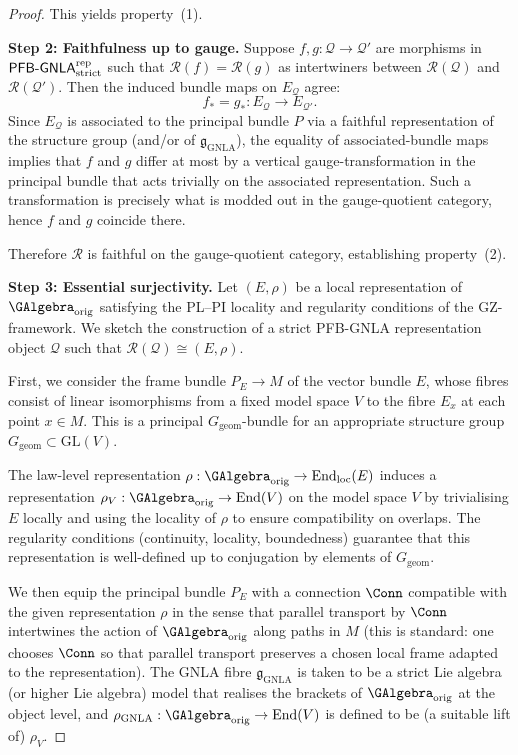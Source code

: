 \documentclass[11pt]{book}
\theoremstyle{plain}
\theoremstyle{definition}
\begin{document}
\begin{proof}
This yields property~\textnormal{(1)}.



\medskip\noindent
\textbf{Step 2: Faithfulness up to gauge.}
Suppose \(f,g:\mathcal{Q}\to\mathcal{Q}'\) are morphisms in
\(\mathsf{PFB\text- GNLA}^{\mathrm{rep}}_{\mathrm{strict}}\) such
that \(\mathcal{R}(f)=\mathcal{R}(g)\) as intertwiners between
\(\mathcal{R}(\mathcal{Q})\) and \(\mathcal{R}(\mathcal{Q}')\).  Then
the induced bundle maps on \(E_{\mathcal{Q}}\) agree:
\[
  f_* = g_* : E_{\mathcal{Q}}\to E_{\mathcal{Q}'}.
\]
Since \(E_{\mathcal{Q}}\) is associated to the principal bundle \(P\)
via a faithful representation of the structure group
(and/or of \(\mathfrak{g}_{\mathrm{GNLA}}\)), the equality of
associated-bundle maps implies that \(f\) and \(g\) differ at most by a
vertical gauge-transformation in the principal bundle that acts
trivially on the associated representation.  Such a transformation is
precisely what is modded out in the gauge-quotient category, hence
 \(f\) and \(g\) coincide there.

Therefore \(\mathcal{R}\) is faithful on the gauge-quotient category,
establishing property~\textnormal{(2)}.



\medskip\noindent
\textbf{Step 3: Essential surjectivity.}
Let \((E,\rho)\) be a local representation of
\(\GAlgebra_{\mathrm{orig}}\) satisfying the PL--PI locality and
regularity conditions of the GZ-framework.  We sketch the construction
of a strict PFB-GNLA representation object \(\mathcal{Q}\) such that
\(\mathcal{R}(\mathcal{Q})\cong(E,\rho)\).

First, we consider the frame bundle \(P_E\to M\) of the vector bundle
 \(E\), whose fibres consist of linear isomorphisms from a fixed model
space \(V\) to the fibre \(E_x\) at each point \(x\in M\).  This is a
principal \(G_{\mathrm{geom}}\)-bundle for an appropriate structure
group \(G_{\mathrm{geom}}\subset\mathrm{GL}(V)\).

The law-level representation \(\rho:\GAlgebra_{\mathrm{orig}}\to
\mathrm{End}_{\mathrm{loc}}(E)\) induces a representation
\(\rho_V:\GAlgebra_{\mathrm{orig}}\to\mathrm{End}(V)\) on the model
space \(V\) by trivialising \(E\) locally and using the locality of
\(\rho\) to ensure compatibility on overlaps.  The regularity
conditions (continuity, locality, boundedness) guarantee that this
representation is well-defined up to conjugation by elements of
 \(G_{\mathrm{geom}}\).

We then equip the principal bundle \(P_E\) with a connection \(\Conn\)
compatible with the given representation \(\rho\) in the sense that
parallel transport by \(\Conn\) intertwines the action of
\(\GAlgebra_{\mathrm{orig}}\) along paths in \(M\) (this is standard:
one chooses \(\Conn\) so that parallel transport preserves a chosen
local frame adapted to the representation).  The GNLA fibre
\(\mathfrak{g}_{\mathrm{GNLA}}\) is taken to be a strict Lie algebra
(or higher Lie algebra) model that realises the brackets of
\(\GAlgebra_{\mathrm{orig}}\) at the object level, and
\(\rho_{\mathrm{GNLA}}:\GAlgebra_{\mathrm{orig}}\to\mathrm{End}(V)\)
is defined to be (a suitable lift of) \(\rho_V\).


\end{proof}
\end{document}
